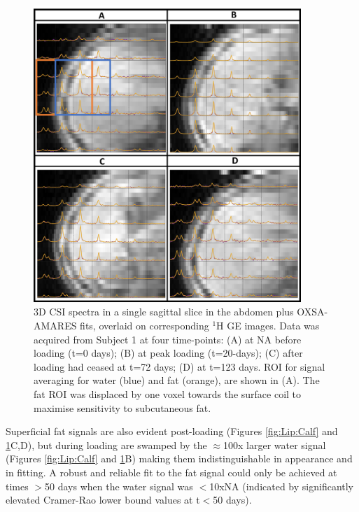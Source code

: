 \documentclass[class=article, crop=false]{standalone}
\begin{document}
\begin{figure}
    \centering
    \includegraphics[width=0.9\textwidth]{Figures/Lipid/Abdomen.png}
    \caption{3D CSI spectra in a single sagittal slice in the abdomen plus OXSA-AMARES fits, overlaid on corresponding $^1$H GE images. Data was acquired from Subject 1 at four time-points: (A) at NA before loading (t=0 days); (B) at peak loading (t=20-days); (C) after loading had ceased at t=72 days; (D) at t=123 days. ROI for signal averaging for water (blue) and fat (orange), are shown in (A). The fat ROI was displaced by one voxel towards the surface coil to maximise sensitivity to subcutaneous fat.}
    \label{fig:Lip:Abdomen}
\end{figure}

Superficial fat signals are also evident post-loading (Figures \ref{fig:Lip:Calf} and \ref{fig:Lip:Abdomen}C,D), but during loading are swamped by the $\approx$100x larger water signal (Figures \ref{fig:Lip:Calf} and \ref{fig:Lip:Abdomen}B) making them indistinguishable in appearance and in fitting. A robust and reliable fit to the fat signal could only be achieved at times $>$50 days when the water signal was $<$10xNA (indicated by significantly elevated Cramer-Rao lower bound values at t$<$50 days).
\end{document}
